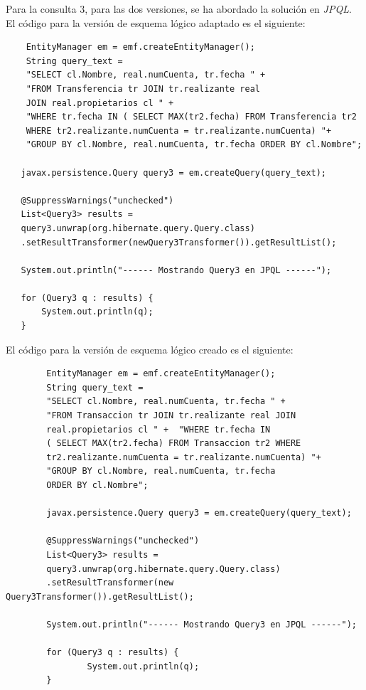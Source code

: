 \documentclass[11pt,a4paper]{article}
\begin{document}
Para la consulta 3, para las dos versiones, se ha abordado la solución en \emph{JPQL}. \\
El código para la versión de esquema lógico adaptado es el siguiente:

\begin{lstlisting}
	EntityManager em = emf.createEntityManager();
	String query_text = 
    "SELECT cl.Nombre, real.numCuenta, tr.fecha " +
    "FROM Transferencia tr JOIN tr.realizante real 
    JOIN real.propietarios cl " + 
    "WHERE tr.fecha IN ( SELECT MAX(tr2.fecha) FROM Transferencia tr2 
    WHERE tr2.realizante.numCuenta = tr.realizante.numCuenta) "+
    "GROUP BY cl.Nombre, real.numCuenta, tr.fecha ORDER BY cl.Nombre";

   javax.persistence.Query query3 = em.createQuery(query_text);

   @SuppressWarnings("unchecked")
   List<Query3> results = 
   query3.unwrap(org.hibernate.query.Query.class)
   .setResultTransformer(newQuery3Transformer()).getResultList();

   System.out.println("------ Mostrando Query3 en JPQL ------");

   for (Query3 q : results) {
       System.out.println(q);
   }
\end{lstlisting}

El código para la versión de esquema lógico creado es el siguiente:

\begin{lstlisting}
        EntityManager em = emf.createEntityManager();
        String query_text = 
        "SELECT cl.Nombre, real.numCuenta, tr.fecha " +
        "FROM Transaccion tr JOIN tr.realizante real JOIN 
        real.propietarios cl " +  "WHERE tr.fecha IN 
        ( SELECT MAX(tr2.fecha) FROM Transaccion tr2 WHERE 
        tr2.realizante.numCuenta = tr.realizante.numCuenta) "+
        "GROUP BY cl.Nombre, real.numCuenta, tr.fecha 
        ORDER BY cl.Nombre";

        javax.persistence.Query query3 = em.createQuery(query_text);

        @SuppressWarnings("unchecked")
        List<Query3> results = 
        query3.unwrap(org.hibernate.query.Query.class)
        .setResultTransformer(new Query3Transformer()).getResultList();

        System.out.println("------ Mostrando Query3 en JPQL ------");

        for (Query3 q : results) {
                System.out.println(q);
        }
\end{lstlisting}
\end{document}
